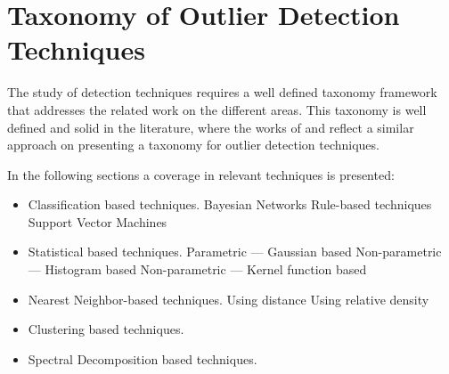 \newpage



\vspace{2em}



\section{Taxonomy of Outlier Detection Techniques}

The study of detection techniques requires a well defined taxonomy framework that addresses the related work on the different areas. This taxonomy is well defined and solid in the literature, where the works of \cite{gen:zhang:2010} and \cite{gen:chandola:2009} reflect a similar approach on presenting a taxonomy for outlier detection techniques.

In the following sections a coverage in relevant techniques is presented:

\begin{itemize}
	\setlength\itemsep{-0.5em}
	\item Classification based techniques.
	\subitem Bayesian Networks
	\subitem Rule-based techniques
	\subitem Support Vector Machines
	
	\item Statistical based techniques.
	\subitem Parametric --- Gaussian based
	\subitem Non-parametric --- Histogram based
	\subitem Non-parametric --- Kernel function based
	
	\item Nearest Neighbor-based techniques.
	\subitem Using distance
	\subitem Using relative density
	
	\item Clustering based techniques.
	
	\item Spectral Decomposition based techniques.
	
\end{itemize}












